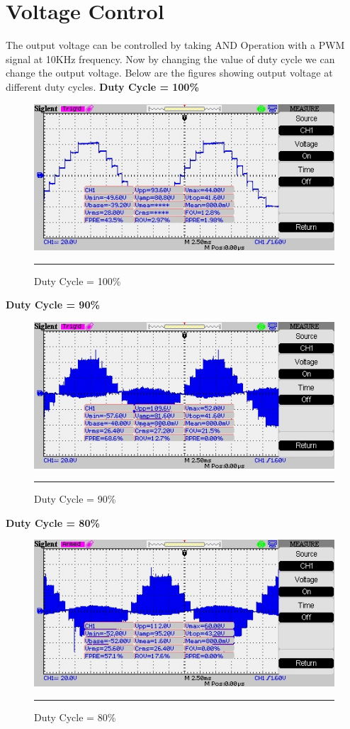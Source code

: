 \section{Voltage Control}
The output voltage can be controlled by taking AND Operation with a PWM signal at 10KHz frequency. Now by changing the value of duty cycle we can change the output voltage. Below are the figures showing output voltage at different duty cycles.
\newline
\newline
\textbf{Duty Cycle = 100\%}
\begin{figure}[htbp]
	\centering
	\includegraphics[width = 6in]{./Figures/Photos/Hardware/33}
	\rule{35em}{1pt}
	\caption{Duty Cycle = 100\%}
\end{figure}

\textbf{Duty Cycle = 90\%}
\begin{figure}[htbp]
	\centering
	\includegraphics[width = 6in]{./Figures/Photos/Hardware/34}
	\rule{35em}{1pt}
	\caption{Duty Cycle = 90\%}
\end{figure}


\textbf{Duty Cycle = 80\%}
\begin{figure}[htbp]
	\centering
	\includegraphics[width = 6in]{./Figures/Photos/Hardware/35}
	\rule{35em}{1pt}
	\caption{Duty Cycle = 80\%}
\end{figure}


